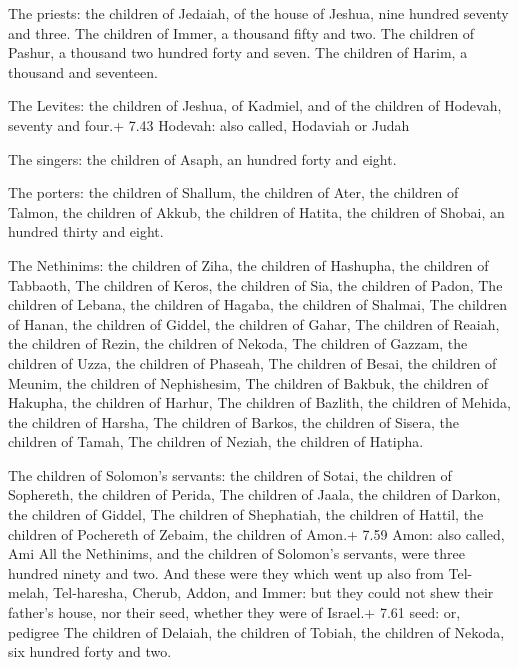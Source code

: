  The priests: the children of Jedaiah, of the house of
Jeshua, nine hundred seventy and three.  The children of
Immer, a thousand fifty and two.  The children of Pashur, a
thousand two hundred forty and seven.  The children of
Harim, a thousand and seventeen.

 The Levites: the children of Jeshua, of Kadmiel, and of
the children of Hodevah, seventy and four.+ 7.43 Hodevah: also called,
Hodaviah or Judah

 The singers: the children of Asaph, an hundred forty and
eight.

 The porters: the children of Shallum, the children of
Ater, the children of Talmon, the children of Akkub, the children of
Hatita, the children of Shobai, an hundred thirty and eight.

 The Nethinims: the children of Ziha, the children of
Hashupha, the children of Tabbaoth,  The children of Keros,
the children of Sia, the children of Padon,  The children
of Lebana, the children of Hagaba, the children of Shalmai,
 The children of Hanan, the children of Giddel, the
children of Gahar,  The children of Reaiah, the children of
Rezin, the children of Nekoda,  The children of Gazzam, the
children of Uzza, the children of Phaseah,  The children of
Besai, the children of Meunim, the children of Nephishesim,
 The children of Bakbuk, the children of Hakupha, the
children of Harhur,  The children of Bazlith, the children
of Mehida, the children of Harsha,  The children of Barkos,
the children of Sisera, the children of Tamah,  The
children of Neziah, the children of Hatipha.

 The children of Solomon's servants: the children of
Sotai, the children of Sophereth, the children of Perida, 
The children of Jaala, the children of Darkon, the children of Giddel,
 The children of Shephatiah, the children of Hattil, the
children of Pochereth of Zebaim, the children of Amon.+ 7.59 Amon: also
called, Ami  All the Nethinims, and the children of
Solomon's servants, were three hundred ninety and two.  And
these were they which went up also from Tel-melah, Tel-haresha, Cherub,
Addon, and Immer: but they could not shew their father's house, nor
their seed, whether they were of Israel.+ 7.61 seed: or, pedigree
 The children of Delaiah, the children of Tobiah, the
children of Nekoda, six hundred forty and two.

